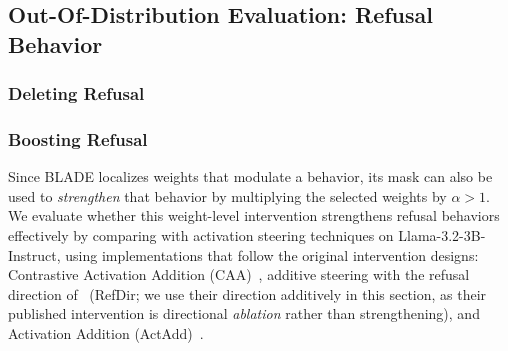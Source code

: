\subsection{Out-Of-Distribution Evaluation: Refusal Behavior}
\subsubsection{Deleting Refusal}
\label{sec:exp-refusal-amplify}

\subsubsection{Boosting Refusal}
\label{sec:exp-refusal-amplify}
Since BLADE localizes weights that modulate a behavior, its mask can also be used to \emph{strengthen} that behavior by multiplying the selected weights by $\alpha>1$. We evaluate whether this weight-level intervention strengthens refusal behaviors effectively by comparing with activation steering techniques on Llama-3.2-3B-Instruct, using implementations that follow the original intervention designs: Contrastive Activation Addition (CAA)~\cite{rimsky2024caa}, additive steering with the refusal direction of~\cite{arditi2024refusal} (RefDir; we use their direction additively in this section, as their published intervention is directional \emph{ablation} rather than strengthening), and Activation Addition (ActAdd)~\cite{turner2024actadd}.

